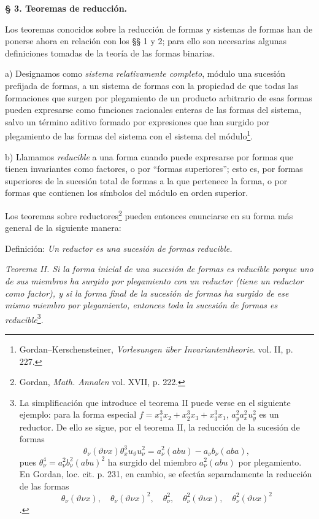 \documentclass[11pt]{article}
\begin{document}
\begin{center}
\textbf{§ 3. \quad Teoremas de reducción.}
\end{center}

Los teoremas conocidos sobre la reducción de formas y sistemas de formas han de ponerse ahora en relación con los §§ 1 y 2; para ello son necesarias algunas definiciones tomadas de la teoría de las formas binarias.

a) Designamos como \emph{sistema relativamente completo}, módulo una sucesión prefijada de formas, a un sistema de formas con la propiedad de que todas las formaciones que surgen por plegamiento de un producto arbitrario de esas formas pueden expresarse como funciones racionales enteras de las formas del sistema, salvo un término aditivo formado por expresiones que han surgido por plegamiento de las formas del sistema con el sistema del módulo\footnote{Gordan--Kerschensteiner, \emph{Vorlesungen über Invariantentheorie}. vol. II, p. 227.}.

b) Llamamos \emph{reducible} a una forma cuando puede expresarse por formas que tienen invariantes como factores, o por ``formas superiores''; esto es, por formas superiores de la sucesión total de formas a la que pertenece la forma, o por formas que contienen los símbolos del módulo en orden superior.

Los teoremas sobre reductores\footnote{Gordan, \emph{Math. Annalen} vol. XVII, p. 222.} pueden entonces enunciarse en su forma más general de la siguiente manera:

Definición: \emph{Un reductor es una sucesión de formas reducible.}

\emph{Teorema II. Si la forma inicial de una sucesión de formas es reducible porque uno de sus miembros ha surgido por plegamiento con un reductor (tiene un reductor como factor), y si la forma final de la sucesión de formas ha surgido de ese mismo miembro por plegamiento, entonces toda la sucesión de formas es reducible}\footnote{La simplificación que introduce el teorema II puede verse en el siguiente ejemplo: para la forma especial $f=x_1^3x_2+x_2^3x_3+x_3^3x_1$, $a_y^2a_x^2u_y^2$ es un reductor. De ello se sigue, por el teorema II, la reducción de la sucesión de formas
\[
\theta_\nu(\vartheta\nu x)\theta_x^3u_\vartheta u_\nu^2
=
a_\nu^2(abu)-a_\nu b_\nu(aba),
\]
pues $\theta_\nu^4=a_\nu^2b_\nu^2(abu)^2$ ha surgido del miembro $a_\nu^2(abu)$ por plegamiento. En Gordan, loc. cit. p. 231, en cambio, se efectúa separadamente la reducción de las formas
\[
\theta_\nu(\vartheta\nu x),\quad \theta_\nu(\vartheta\nu x)^2,\quad
\theta_\nu^2,\quad \theta_\nu^2(\vartheta\nu x),\quad
\theta_\nu^2(\vartheta\nu x)^2
\]
.}.
\end{document}
